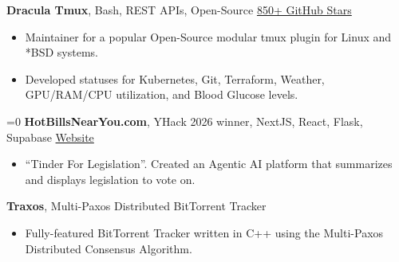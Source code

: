 \textbf{Dracula Tmux}, Bash, REST APIs, Open-Source \hfill \href{https://github.com/dracula/tmux}{850+ GitHub Stars}

\begin{itemize}[noitemsep]
    \item Maintainer for a popular Open-Source modular tmux plugin for Linux and *BSD systems.
    \item Developed statuses for Kubernetes, Git, Terraform, Weather, GPU/RAM/CPU utilization, and Blood Glucose levels.
\end{itemize}

\ifnum{}=0
\textbf{HotBillsNearYou.com}, YHack 2026 winner, NextJS, React, Flask, Supabase \hfill \href{https://hotbillsnearyou.com/}{Website}

\begin{itemize}[noitemsep]
    \item ``Tinder For Legislation''. Created an Agentic AI platform that summarizes and displays legislation to vote on.
\end{itemize}
\fi

\textbf{Traxos}, Multi-Paxos Distributed BitTorrent Tracker

\begin{itemize}[noitemsep]
    \item Fully-featured BitTorrent Tracker written in C++ using the Multi-Paxos Distributed Consensus Algorithm.
\end{itemize}
